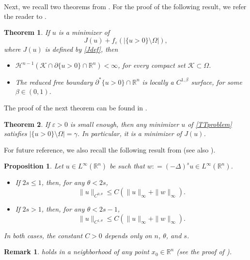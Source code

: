 \documentclass[11pt, reqno]{amsart}
\newtheorem{theorem}{Theorem}
\newtheorem{proposition}{Proposition}
\newtheorem{remark}{Remark}
\numberwithin{equation}{section}
\numberwithin{theorem}{section}
\numberwithin{lemma}{section}
\numberwithin{corollary}{section}
\numberwithin{remark}{section}
\numberwithin{proposition}{section}
\numberwithin{definition}{section}
\newcommand{\R}{\mathbb{R}}
\begin{document}
Next, we recall two theorems from \cite{TT15}. For the proof of the following result, we refer the reader to \cite[Theorem 3.1]{TT15}.
\begin{theorem}\label{TTfb}
    If $u$ is a minimizer of 
    \begin{equation}\label{TTproblem}
    J(u)+f_\varepsilon(|\{u>0\}\setminus\Omega|),    
    \end{equation}
    where $J(u)$ is defined by \eqref{Jdef}, then
	\begin{itemize}
		\item $\mathcal{H}^{n-1}(\mathcal{K}\cap\partial\{u>0\}\cap\mathbb{R}^n)<\infty$, for every compact set $\mathcal{K}\subset\Omega$.
		\item The reduced free boundary $\partial^*\{u>0\}\cap\mathbb{R}^n$ is locally a $C^{1,\beta}$ surface, for some $\beta\in(0,1)$.
	\end{itemize}
\end{theorem}
The proof of the next theorem can be found in \cite[Theorem 5.1]{TT15}.
\begin{theorem}\label{TT}
    If $\varepsilon>0$ is small enough, then any minimizer $u$ of \eqref{TTproblem}  satisfies $|\{u>0\}\setminus\Omega|=\gamma$. In particular, it is a minimizer of $J(u)$.   
\end{theorem}
For future reference, we also recall the following result from \cite[Proposition 2.9]{S07} (see also \cite{PST25, T24}).
\begin{proposition}\label{prop:silv-regularity}
	Let $u\in L^\infty(\R^n)$ be such that $w : = (-\Delta)^{s} u \in L^\infty(\R^n)$.
	\begin{itemize}
		\item If $2 s \le 1$, then, for any $\theta< 2 s$, 
		\[
		\|u\|_{C^{0,\theta}}\le C \left(\|u\|_\infty+\|w\|_\infty\right).
		\]
		\item If $2 s > 1$, then, for any $\theta < 2 s -1$,
		\[
		\|u\|_{C^{1,\theta}}\le C \left(\|u\|_\infty+\|w\|_\infty\right).
		\]
	\end{itemize} In both cases, the constant $C>0$ depends only on $n$, $\theta$, and $s$.
\end{proposition}
\begin{remark}\label{r2.3}
	 holds in a neighborhood of any point $x_0\in\R^n$ (see the proof of \cite[Proposition 2.9]{S07}).
\end{remark}
\end{document}
